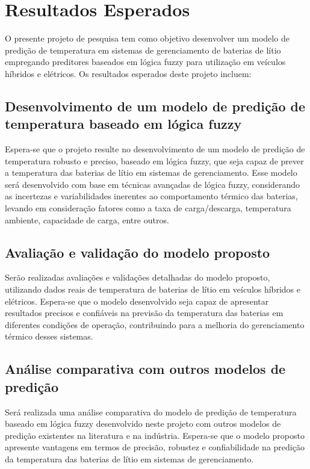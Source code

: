 \section{Resultados Esperados}

O presente projeto de pesquisa tem como objetivo desenvolver um modelo de predição de temperatura em sistemas de gerenciamento de baterias de lítio empregando preditores baseados em lógica fuzzy para utilização em veículos híbridos e elétricos. Os resultados esperados deste projeto incluem:

\subsection{Desenvolvimento de um modelo de predição de temperatura baseado em lógica fuzzy}
 Espera-se que o projeto resulte no desenvolvimento de um modelo de predição de temperatura robusto e preciso, baseado em lógica fuzzy, que seja capaz de prever a temperatura das baterias de lítio em sistemas de gerenciamento. Esse modelo será desenvolvido com base em técnicas avançadas de lógica fuzzy, considerando as incertezas e variabilidades inerentes ao comportamento térmico das baterias, levando em consideração fatores como a taxa de carga/descarga, temperatura ambiente, capacidade de carga, entre outros.

\subsection{Avaliação e validação do modelo proposto}
Serão realizadas avaliações e validações detalhadas do modelo proposto, utilizando dados reais de temperatura de baterias de lítio em veículos híbridos e elétricos. Espera-se que o modelo desenvolvido seja capaz de apresentar resultados precisos e confiáveis na previsão da temperatura das baterias em diferentes condições de operação, contribuindo para a melhoria do gerenciamento térmico desses sistemas.

\subsection{Análise comparativa com outros modelos de predição}
Será realizada uma análise comparativa do modelo de predição de temperatura baseado em lógica fuzzy desenvolvido neste projeto com outros modelos de predição existentes na literatura e na indústria. Espera-se que o modelo proposto apresente vantagens em termos de precisão, robustez e confiabilidade na predição da temperatura das baterias de lítio em sistemas de gerenciamento.

